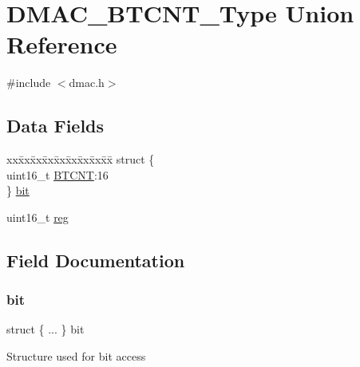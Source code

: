 \hypertarget{union_d_m_a_c___b_t_c_n_t___type}{}\section{D\+M\+A\+C\+\_\+\+B\+T\+C\+N\+T\+\_\+\+Type Union Reference}
\label{union_d_m_a_c___b_t_c_n_t___type}


{\ttfamily \#include $<$dmac.\+h$>$}

\subsection*{Data Fields}
\begin{DoxyCompactItemize}
\item 
\begin{tabbing}
xx\=xx\=xx\=xx\=xx\=xx\=xx\=xx\=xx\=\kill
struct \{\\
\>uint16\_t \mbox{\hyperlink{union_d_m_a_c___b_t_c_n_t___type_a30182a173f4a1b21ef4b0d7ee6c2cdc5}{BTCNT}}:16\\
\} \mbox{\hyperlink{union_d_m_a_c___b_t_c_n_t___type_af4172138cee9d6909c23d70a9a015075}{bit}}\\

\end{tabbing}\item 
uint16\+\_\+t \mbox{\hyperlink{union_d_m_a_c___b_t_c_n_t___type_a11760f5020019f4aa8cb02e694f7cc44}{reg}}
\end{DoxyCompactItemize}


\subsection{Field Documentation}
\mbox{\label{union_d_m_a_c___b_t_c_n_t___type_af4172138cee9d6909c23d70a9a015075}} 
\subsubsection{\texorpdfstring{bit}{bit}}
{\footnotesize\ttfamily struct \{ ... \}   bit}

Structure used for bit access \mbox{\label{union_d_m_a_c___b_t_c_n_t___type_a30182a173f4a1b21ef4b0d7ee6c2cdc5}} 
